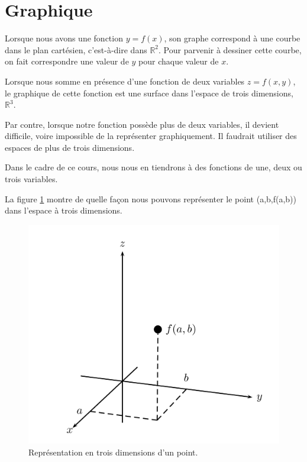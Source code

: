 \documentclass[]{book}
\theoremstyle{definition}
\theoremstyle{definition}
\theoremstyle{definition}
\theoremstyle{remark}
\let\BeginKnitrBlock\begin \let\EndKnitrBlock\end
\begin{document}
\hypertarget{graphiques-divers}{%
\section{Graphique}\label{graphiques-divers}}

Lorsque nous avons une fonction \(y=f(x)\), son graphe correspond à une
courbe dans le plan cartésien, c'est-à-dire dans \(\mathbb{R}^2\). Pour
parvenir à dessiner cette courbe, on fait correspondre une valeur de
\(y\) pour chaque valeur de \(x\).

Lorsque nous somme en présence d'une fonction de deux variables
\(z=f(x,y)\), le graphique de cette fonction est une surface dans
l'espace de trois dimensions, \(\mathbb{R}^3\).

Par contre, lorsque notre fonction possède plus de deux variables, il
devient difficile, voire impossible de la représenter graphiquement. Il
faudrait utiliser des espaces de plus de trois dimensions.

\BeginKnitrBlock{remark}
{}Dans le cadre de ce cours, nous nous en
tiendrons à des fonctions de une, deux ou trois variables.
\EndKnitrBlock{remark}

La figure \ref{fig:point3d} montre de quelle façon nous pouvons
représenter le point (a,b,f(a,b)) dans l'espace à trois dimensions.

\begin{figure}

{\centering \includegraphics[width=0.75\linewidth]{resources/images/latex/point3d} 

}

\caption{Représentation en trois dimensions d'un point.}\label{fig:point3d}
\end{figure}
\end{document}
